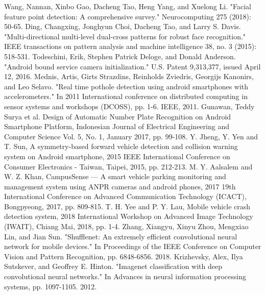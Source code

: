 \documentclass[12pt, a4paper]{article}
\begin{document}
\begin{thebibliography}{9}
 Wang, Nannan, Xinbo Gao, Dacheng Tao, Heng Yang, and Xuelong Li. "Facial feature point detection: A comprehensive survey." Neurocomputing 275 (2018): 50-65.
 Ding, Changxing, Jonghyun Choi, Dacheng Tao, and Larry S. Davis. "Multi-directional multi-level dual-cross patterns for robust face recognition." IEEE transactions on pattern analysis and machine intelligence 38, no. 3 (2015): 518-531.
 Todeschini, Erik, Stephen Patrick Deloge, and Donald Anderson. "Android bound service camera initialization." U.S. Patent 9,313,377, issued April 12, 2016.
 Mednis, Artis, Girts Strazdins, Reinholds Zviedris, Georgijs Kanonirs, and Leo Selavo. "Real time pothole detection using android smartphones with accelerometers." In 2011 International conference on distributed computing in sensor systems and workshops (DCOSS), pp. 1-6. IEEE, 2011.
 Gunawan, Teddy Surya et al. Design of Automatic Number Plate Recognition on Android Smartphone Platform, Indonesian Journal of Electrical Engineering and Computer Science Vol. 5, No. 1, January 2017, pp. 99-108.
 Y. Jheng, Y. Yen and T. Sun, A symmetry-based forward vehicle detection and collision warning system on Android smartphone, 2015 IEEE International Conference on Consumer Electronics - Taiwan, Taipei, 2015, pp. 212-213.
 M. Y. Aalsalem and W. Z. Khan, CampusSense — A smart vehicle parking monitoring and management system using ANPR cameras and android phones, 2017 19th International Conference on Advanced Communication Technology (ICACT), Bongpyeong, 2017, pp. 809-815.
 T. H. Yee and P. Y. Lau, Mobile vehicle crash detection system, 2018 International Workshop on Advanced Image Technology (IWAIT), Chiang Mai, 2018, pp. 1-4.
 Zhang, Xiangyu, Xinyu Zhou, Mengxiao Lin, and Jian Sun. "Shufflenet: An extremely efficient convolutional neural network for mobile devices." In Proceedings of the IEEE Conference on Computer Vision and Pattern Recognition, pp. 6848-6856. 2018.
 Krizhevsky, Alex, Ilya Sutskever, and Geoffrey E. Hinton. "Imagenet classification with deep convolutional neural networks." In Advances in neural information processing systems, pp. 1097-1105. 2012.

\end{thebibliography}
\end{document}

